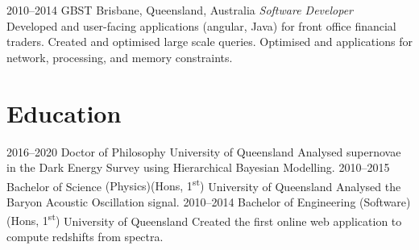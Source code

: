 \documentclass[]{friggeri-cv2}
\begin{document}
\begin{entrylist}

\entry
{2010--2014}
{GBST}
{Brisbane, Queensland, Australia}
{\emph{Software Developer} \\
Developed  and user-facing applications (angular, Java) 
for front office financial traders. Created and optimised large scale  queries. 
Optimised  and applications for network, processing, and memory constraints.}

\end{entrylist}


\section{Education}

\begin{entrylist}
\entry
{2016--2020}
{Doctor of Philosophy}
{University of Queensland}
{Analysed supernovae in the Dark Energy Survey using Hierarchical Bayesian Modelling.}
\entry
{2010--2015}
{Bachelor of Science {\normalfont (Physics)(Hons, 1\textsuperscript{st})}}
{University of Queensland}
{Analysed the Baryon Acoustic Oscillation signal.}
\entry
{2010--2014}
{Bachelor of Engineering {\normalfont (Software)(Hons, 1\textsuperscript{st})}}
{University of Queensland}
{Created the first online web application to compute redshifts from spectra.}
\end{entrylist}
\end{document}
